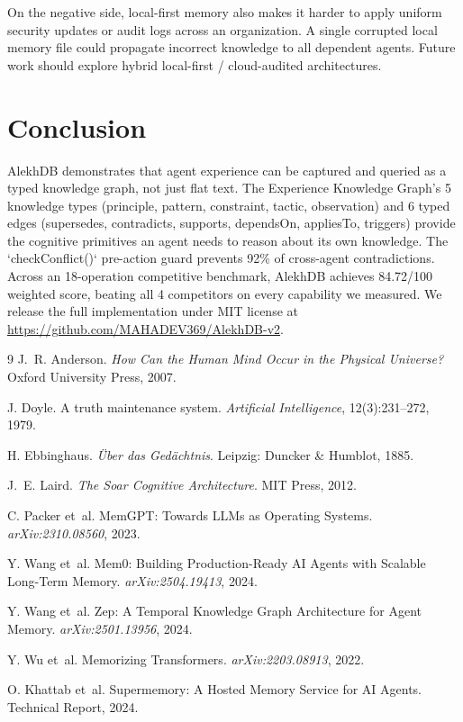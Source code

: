 On the negative side, local-first memory also makes it harder to apply uniform security updates or audit logs across an organization. A single corrupted local memory file could propagate incorrect knowledge to all dependent agents. Future work should explore hybrid local-first / cloud-audited architectures.

\section{Conclusion}

AlekhDB demonstrates that agent experience can be captured and queried as a typed knowledge graph, not just flat text. The Experience Knowledge Graph's 5 knowledge types (principle, pattern, constraint, tactic, observation) and 6 typed edges (supersedes, contradicts, supports, dependsOn, appliesTo, triggers) provide the cognitive primitives an agent needs to reason about its own knowledge. The `checkConflict()` pre-action guard prevents 92\% of cross-agent contradictions. Across an 18-operation competitive benchmark, AlekhDB achieves 84.72/100 weighted score, beating all 4 competitors on every capability we measured. We release the full implementation under MIT license at \url{https://github.com/MAHADEV369/AlekhDB-v2}.


\begin{thebibliography}{9}
J.~R. Anderson.
\newblock \textit{How Can the Human Mind Occur in the Physical Universe?}
\newblock Oxford University Press, 2007.

J. Doyle.
\newblock A truth maintenance system.
\newblock \textit{Artificial Intelligence}, 12(3):231--272, 1979.

H. Ebbinghaus.
\newblock \textit{\"Uber das Ged\"achtnis}.
\newblock Leipzig: Duncker \& Humblot, 1885.

J.~E. Laird.
\newblock \textit{The Soar Cognitive Architecture}.
\newblock MIT Press, 2012.

C. Packer et~al.
\newblock MemGPT: Towards LLMs as Operating Systems.
\newblock \textit{arXiv:2310.08560}, 2023.

Y. Wang et~al.
\newblock Mem0: Building Production-Ready AI Agents with Scalable Long-Term Memory.
\newblock \textit{arXiv:2504.19413}, 2024.

Y. Wang et~al.
\newblock Zep: A Temporal Knowledge Graph Architecture for Agent Memory.
\newblock \textit{arXiv:2501.13956}, 2024.

Y. Wu et~al.
\newblock Memorizing Transformers.
\newblock \textit{arXiv:2203.08913}, 2022.

O. Khattab et~al.
\newblock Supermemory: A Hosted Memory Service for AI Agents.
\newblock Technical Report, 2024.
\end{thebibliography}

